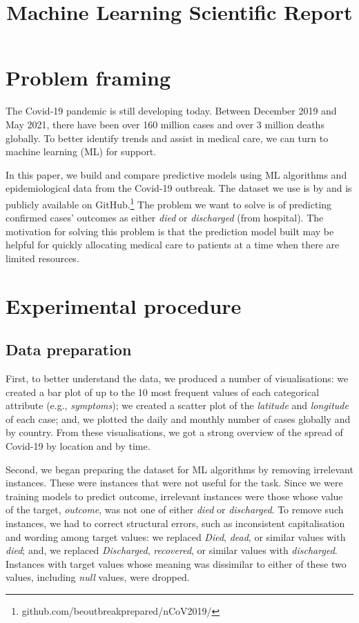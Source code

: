 \documentclass[twoside,11pt]{article}
\begin{document}
\title{Machine Learning Scientific Report}



\maketitle

\section{Problem framing}
The Covid‑19 pandemic is still developing today. Between December 2019 and May 2021, there have been over 160 million cases and over 3 million deaths globally. To better identify trends and assist in medical care, we can turn to machine learning (ML) for support.

In this paper, we build and compare predictive models using ML algorithms and epidemiological data from the Covid-19 outbreak. The dataset we use is by \cite{xu2020Epidemiological} and is publicly available on GitHub.\footnote{github.com/beoutbreakprepared/nCoV2019/} The problem we want to solve is of predicting confirmed cases' outcomes as either \emph{died} or \emph{discharged} (from hospital). The motivation for solving this problem is that the prediction model built may be helpful for quickly allocating medical care to patients at a time when there are limited resources. 

\section{Experimental procedure}
\subsection{Data preparation}
First, to better understand the data, we produced a number of visualisations: we created a bar plot of up to the 10 most frequent values of each categorical attribute (e.g., \emph{symptoms}); we created a scatter plot of the \emph{latitude} and \emph{longitude} of each case; and, we plotted the daily and monthly number of cases globally and by country. From these visualisations, we got a strong overview of the spread of Covid-19 by location and by time.

Second, we began preparing the dataset for ML algorithms by removing irrelevant instances. These were instances that were not useful for the task. Since we were training models to predict outcome, irrelevant instances were those whose value of the target, \emph{outcome}, was not one of either \emph{died} or \emph{discharged}. To remove such instances, we had to correct structural errors, such as inconsistent capitalisation and wording among target values: we replaced \emph{Died}, \emph{dead}, or similar values with \emph{died}; and, we replaced \emph{Discharged}, \emph{recovered}, or similar values with \emph{discharged}. Instances with target values whose meaning was dissimilar to either of these two values, including \emph{null} values, were dropped.
\end{document}

